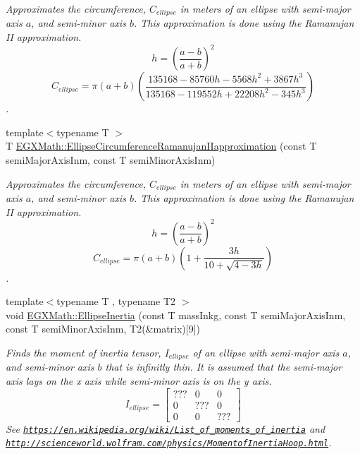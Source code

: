 \begin{DoxyCompactItemize}
\begin{DoxyCompactList}\small\item\em Approximates the circumference, $C_{ellipse}$ in meters of an ellipse with semi-\/major axis $a$, and semi-\/minor axis $b$. This approximation is done using the Ramanujan II approximation. \[ h=\left( \frac{a-b}{a+b} \right)^2 \] \[ C_{ellipse}=\pi (a + b) \left( \frac{135168-85760 h-5568 h^2+ 3867 h^3}{135168-119552 h+ 22208 h^2 - 345h^3} \right) \]. \end{DoxyCompactList}\item 
{\footnotesize template$<$typename T $>$ }\\T \mbox{\hyperlink{group___e_g_x_math-_geometry-2_d-_ellipse_gaa908406db81fadc7c2d73e4e113d24d7}{E\+G\+X\+Math\+::\+Ellipse\+Circumference\+Ramanujan\+I\+Iapproximation}} (const T semi\+Major\+Axis\+Inm, const T semi\+Minor\+Axis\+Inm)
\begin{DoxyCompactList}\small\item\em Approximates the circumference, $C_{ellipse}$ in meters of an ellipse with semi-\/major axis $a$, and semi-\/minor axis $b$. This approximation is done using the Ramanujan II approximation. \[ h=\left( \frac{a-b}{a+b} \right)^2 \] \[ C_{ellipse}=\pi (a + b) \left( 1+\frac{3h}{10+\sqrt{4-3h}} \right) \]. \end{DoxyCompactList}\item 
{\footnotesize template$<$typename T , typename T2 $>$ }\\void \mbox{\hyperlink{group___e_g_x_math-_geometry-2_d-_ellipse_ga10a3049c2f04b50f271fb01dc62e4cf8}{E\+G\+X\+Math\+::\+Ellipse\+Inertia}} (const T mass\+Inkg, const T semi\+Major\+Axis\+Inm, const T semi\+Minor\+Axis\+Inm, T2(\&matrix)\mbox{[}9\mbox{]})
\begin{DoxyCompactList}\small\item\em Finds the moment of inertia tensor, $I_{ellipse}$ of an ellipse with semi-\/major axis $a$, and semi-\/minor axis $b$ that is infinitly thin. It is assumed that the semi-\/major axis lays on the x axis while semi-\/minor axis is on the y axis. \[ I_{ellipse}=\begin{bmatrix} ??? & 0 & 0\\ 0 & ??? & 0\\ 0 & 0 & ??? \end{bmatrix} \] See \href{https://en.wikipedia.org/wiki/List_of_moments_of_inertia}{\tt https\+://en.\+wikipedia.\+org/wiki/\+List\+\_\+of\+\_\+moments\+\_\+of\+\_\+inertia} and \href{http://scienceworld.wolfram.com/physics/MomentofInertiaHoop.html}{\tt http\+://scienceworld.\+wolfram.\+com/physics/\+Momentof\+Inertia\+Hoop.\+html}. \end{DoxyCompactList}\item 

\end{DoxyCompactItemize}
